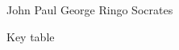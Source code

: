 \documentclass[answers,addpoints]{exam}
\begin{document}
\begin{questions}
\begin{oneparcheckboxes}%
\choice John
\choice Paul
\choice George
\choice Ringo
\CorrectChoice Socrates
\end{oneparcheckboxes}


\end{questions}

\hrulefill

Key table

\printkeytable

\writekeylist{\mykeylist}
\end{document}
